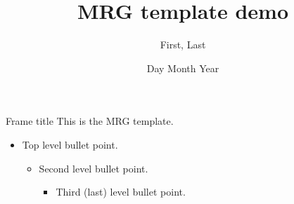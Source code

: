 \documentclass{beamer}
\title{MRG template demo}
\author{First, Last}
\date{Day Month Year}
\begin{document}
\maketitle

\begin{frame}{Frame title}
  This is the MRG template.
  \begin{itemize}
    \item Top level bullet point.
      \begin{itemize}
        \item Second level bullet point.
          \begin{itemize}
            \item Third (last) level bullet point.
          \end{itemize}
      \end{itemize}
  \end{itemize}
\end{frame}
\end{document}
